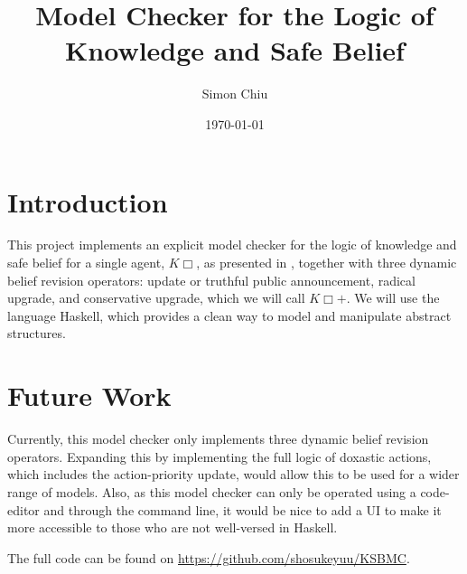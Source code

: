 \documentclass[12pt,a4paper]{article}
\title{Model Checker for the Logic of Knowledge and Safe Belief}
\author{Simon Chiu}
\date{\today}
\begin{document}
\maketitle

\newpage

\tableofcontents

\clearpage


\section{Introduction}\label{sec:Introduction}
This project implements an explicit model checker for the logic of knowledge and safe belief for a single agent, $K\Box$, as presented in \cite{baltagQualitativeTheoryDynamic2008}, together with three dynamic belief revision operators: update or truthful public announcement, radical upgrade, and conservative upgrade, which we will call $K\Box +$. We will use the language Haskell, which provides a clean way to model and manipulate abstract structures.









\section{Future Work}\label{sec:Conclusion}
Currently, this model checker only implements three dynamic belief revision operators. Expanding this by implementing the full logic of doxastic actions, which includes the action-priority update, would allow this to be used for a wider range of models. Also, as this model checker can only be operated using a code-editor and through the command line, it would be nice to add a UI to make it more accessible to those who are not well-versed in Haskell. 

The full code can be found on \url{https://github.com/shosukeyuu/KSBMC}.



\end{document}
